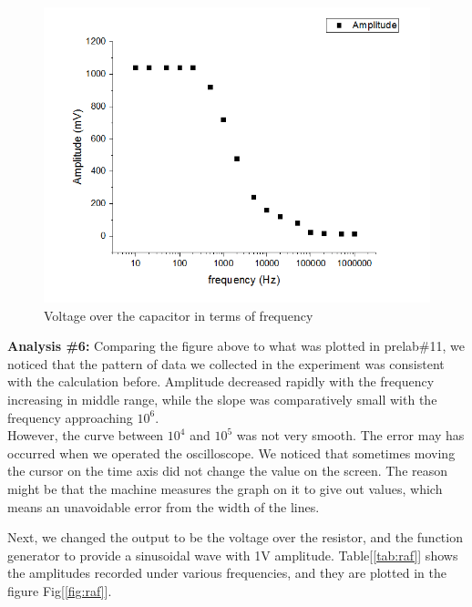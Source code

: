 \begin{figure}[!htbp]
	\centering
	\includegraphics[width=\linewidth]{images/c-amp-freq.png}
	\caption{Voltage over the capacitor in terms of frequency}
	\label{fig:caf}
\end{figure}

\textbf{Analysis \#6:} \newline
\phantom{ } Comparing the figure above to what was plotted in prelab\#11, we noticed that the pattern of data we collected in the experiment was consistent with the calculation before. Amplitude decreased rapidly with the frequency increasing in middle range, while the slope was comparatively small with the frequency approaching $10^6$.\\
\phantom{ } However, the curve between $10^4$ and $10^5$ was not very smooth. The error may has occurred when we operated the oscilloscope. We noticed that sometimes moving the cursor on the time axis did not change the value on the screen. The reason might be that the machine measures the graph on it to give out values, which means an unavoidable error from the width of the lines.

\phantom{ } Next, we changed the output to be the voltage over the resistor, and the function generator to provide a sinusoidal wave with 1V amplitude. Table[\ref{tab:raf}] shows the amplitudes recorded under various frequencies, and they are plotted in the figure Fig[\ref{fig:raf}].

